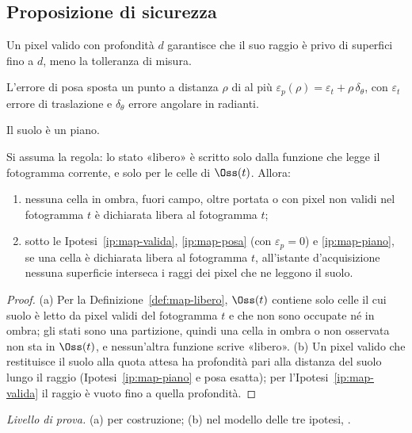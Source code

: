\subsection{Proposizione di sicurezza}\label{sec:map-sicurezza}

\begin{ipotesi}[Profondità valida = giusta]\label{ip:map-valida} Un pixel valido con profondità $d$ garantisce che il suo raggio è privo di superfici fino a $d$, meno la tolleranza di misura.\end{ipotesi}
\begin{ipotesi}\label{ip:map-posa} L'errore di posa sposta un punto a distanza $\rho$ di al più $\varepsilon_p(\rho)=\varepsilon_t+\rho\,\delta_\theta$, con $\varepsilon_t$ errore di traslazione e $\delta_\theta$ errore angolare in radianti.\end{ipotesi}
\begin{ipotesi}\label{ip:map-piano} Il suolo è un piano.\end{ipotesi}

\begin{proposizione}\label{prop:map-sicurezza}
Si assuma la regola: lo stato «libero» è scritto solo dalla funzione che legge il fotogramma corrente, e solo per le celle di $\Oss(t)$. Allora:
\begin{enumerate}[label=(\alph*)]
\item nessuna cella in ombra, fuori campo, oltre portata o con pixel non validi nel fotogramma $t$ è dichiarata libera al fotogramma $t$;
\item sotto le Ipotesi~\ref{ip:map-valida}, \ref{ip:map-posa} (con $\varepsilon_p=0$) e \ref{ip:map-piano}, se una cella è dichiarata libera al fotogramma $t$, all'istante d'acquisizione nessuna superficie interseca i raggi dei pixel che ne leggono il suolo.
\end{enumerate}
\end{proposizione}
\begin{proof}
(a) Per la Definizione~\ref{def:map-libero}, $\Oss(t)$ contiene solo celle il cui suolo è letto da pixel validi del fotogramma $t$ e che non sono occupate né in ombra; gli stati sono una partizione, quindi una cella in ombra o non osservata non sta in $\Oss(t)$, e nessun'altra funzione scrive «libero». (b) Un pixel valido che restituisce il suolo alla quota attesa ha profondità pari alla distanza del suolo lungo il raggio (Ipotesi~\ref{ip:map-piano} e posa esatta); per l'Ipotesi~\ref{ip:map-valida} il raggio è vuoto fino a quella profondità.
\end{proof}
\emph{Livello di prova.} (a)  per costruzione; (b)  nel modello delle tre ipotesi, .

